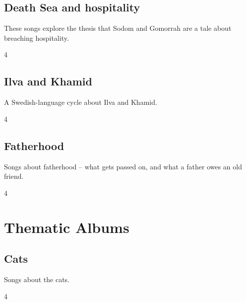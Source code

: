 \documentclass[a4paper,landscape]{memoir}
\begin{document}
\chapter{Death Sea and hospitality}
These songs explore the thesis that Sodom and Gomorrah are a tale about breaching hospitality.
\clearpage\begin{multicols*}{4}




\end{multicols*}

\chapter{Ilva and Khamid}
A Swedish-language cycle about Ilva and Khamid.
\clearpage\begin{multicols*}{4}



\end{multicols*}

\chapter{Fatherhood}
Songs about fatherhood -- what gets passed on, and what a father owes an old friend.
\clearpage\begin{multicols*}{4}




\end{multicols*}

\part{Thematic Albums}

\chapter{Cats}
Songs about the cats.
\clearpage\begin{multicols*}{4}








\end{multicols*}
\end{document}

